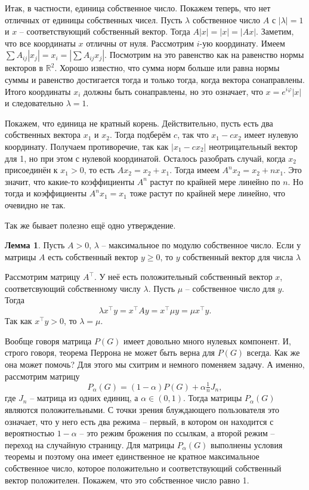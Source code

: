 \documentclass[10pt,a4paper,oneside]{book}
\theoremstyle{definition}
\newtheorem{lem}{{\color{green!50!black} Лемма}}
\newcommand{\mb}[1]{\mathbb{#1}}
\def\ffi{\varphi}
\def\lm{\begin{lem}}
\def\elm{\end{lem}}
\begin{document}
Итак, в частности, единица собственное число. Покажем теперь, что нет отличных от единицы собственных чисел. Пусть $\lambda$ собственное число $A$ с $|\lambda|=1$ и $x$ -- соответствующий собственный вектор. Тогда $A|x|=|x|=|Ax|$. Заметим, что все координаты $x$ отличны от нуля. Рассмотрим $i$-ую координату. Имеем $\sum A_{ij}|x_j|=x_i=|\sum A_{ij}x_j|$. Посмотрим на это равенство как на равенство нормы векторов в $\mb R^2$. Хорошо известно, что сумма норм больше или равна нормы суммы и равенство достигается тогда и только тогда, когда вектора сонаправлены. Итого координаты $x_i$ должны быть сонаправлены, но это означает, что $x=e^{i\ffi} |x|$ и следовательно $\lambda=1$. 

Покажем, что единица не кратный корень. Действительно, пусть есть два собственных вектора $x_1$ и $x_2$. Тогда подберём $c$, так что $x_1-cx_2$ имеет нулевую координату. Получаем противоречие, так как $|x_1-cx_2|$ неотрицательный вектор для 1, но при этом с нулевой координатой. Осталось разобрать случай, когда $x_2$ присоединён к $x_1>0$, то есть $Ax_2=x_2+x_1$. Тогда имеем $A^nx_2=x_2 +nx_1$. Это значит, что какие-то коэффициенты $A^n$ растут по крайней мере линейно по $n$. Но тогда и коэффициенты $A^nx_1=x_1$ тоже растут по крайней мере линейно, что очевидно не так.
\endproof

Так же бывает полезно ещё одно утверждение. 
\lm Пусть $A>0$, $\lambda$ -- максимальное по модулю собственное число. Если у матрицы $A$ есть собственный вектор $y\geq 0$, то $y$ собственный вектор для числа $\lambda$
\elm
\proof Рассмотрим матрицу $A^{\top}$. У неё есть положительный  собственный вектор $x$, соответсвующий собственному числу $\lambda$. Пусть $\mu$ -- собственное число для $y$. Тогда 
$$\lambda x^{\top}y= x^{\top}Ay=x^{\top}\mu y=\mu x^{\top}y.$$
Так как $x^{\top}y >0$, то $\lambda=\mu$.
\endproof


Вообще говоря матрица $P(G)$ имеет довольно много нулевых компонент. И, строго говоря, теорема Перрона не может быть верна для $P(G)$ всегда. Как же она может помочь? Для этого мы схитрим и немного поменяем задачу. А именно, рассмотрим матрицу $$P_{\alpha}(G)=(1-\alpha) P(G) + \alpha\tfrac{1}{n}J_n,$$
где $J_n$ -- матрица из одних единиц, а $\alpha \in (0,1)$. Тогда матрицы $P_{\alpha}(G)$ являются положительными. С точки зрения блуждающего пользователя это означает, что у него есть два режима -- первый, в котором он находится с вероятностью $1-\alpha$ -- это режим брожения по ссылкам, а второй режим -- переход на случайную страницу. Для матрицы $P_{\alpha}(G)$ выполнены условия теоремы и поэтому она имеет единственное не кратное максимальное собственное число, которое положительно и соответствующий собственный вектор положителен. Покажем, что это собственное число равно 1.
\end{document}
